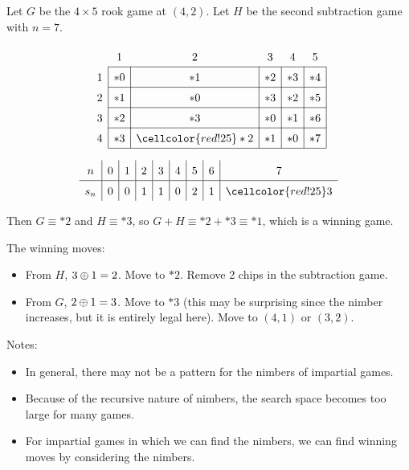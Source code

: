 \documentclass[12pt,letterpaper]{report}
\begin{document}
\begin{ex}
  Let $G$ be the $4 \times 5$ rook game at $(4, 2)$.
  Let $H$ be the second subtraction game with $n = 7$.

  \begin{minipage}{0.45\textwidth}
    \centering
    \[
      \renewcommand{\arraystretch}{1.5}
      \begin{array}{c|c|c|c|c|c|}
        \multicolumn{1}{c}{} & \multicolumn{1}{c}{1} & \multicolumn{1}{c}{2} & \multicolumn{1}{c}{3}
          & \multicolumn{1}{c}{4} & \multicolumn{1}{c}{5} \\
        \cline{2-6}
        1 & *0 & *1 & *2 & *3 & *4 \\
        \cline{2-6}
        2 & *1 & *0 & *3 & *2 & *5 \\
        \cline{2-6}
        3 & *2 & *3 & *0 & *1 & *6 \\
        \cline{2-6}
        4 & *3 & \cellcolor{red!25} *2 & *1 & *0 & *7 \\
        \cline{2-6}
      \end{array}
    \]
  \end{minipage}\hfill
  \begin{minipage}{0.54\textwidth}
    \[
      \begin{array}{c|c|c|c|c|c|c|c|c}
        n & 0 & 1 & 2 & 3 & 4 & 5 & 6 & 7 \\
        \hline
        s_n & 0 & 0 & 1 & 1 & 0 & 2 & 1 & \cellcolor{red!25} 3 \\
      \end{array}
    \]
  \end{minipage}

  \vspace{\baselineskip}
  Then $G \equiv *2$ and $H \equiv *3$, so $G + H \equiv *2 + *3 \equiv *1$, which is a winning
  game.

  The winning moves:
  \begin{itemize}
    \item
      From $H$, $3 \oplus 1 = 2$.
      Move to $*2$.
      Remove 2 chips in the subtraction game.
    \item
      From $G$, $2 \oplus 1 = 3$.
      Move to $*3$ (this may be surprising since the nimber increases, but it is entirely legal
      here).
      Move to $(4, 1)$ or $(3, 2)$.
  \end{itemize}
\end{ex}

Notes:
\begin{itemize}
  \item
    In general, there may not be a pattern for the nimbers of impartial games.
  \item
    Because of the recursive nature of nimbers, the search space becomes too large for many games.
  \item
    For impartial games in which we can find the nimbers, we can find winning moves by considering
    the nimbers.
\end{itemize}
\end{document}
